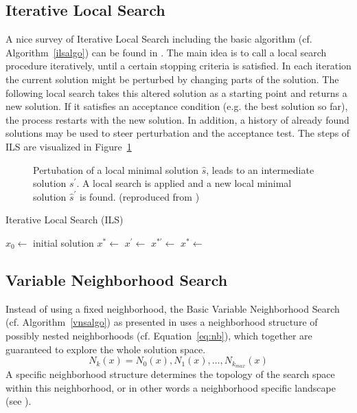 \subsection{Iterative Local Search}
A nice survey of Iterative Local Search including the basic algorithm (cf. Algorithm~\ref{ilsalgo}) can be found in \cite{lourencco2001iterated}. 
The main idea is to call a local search procedure iteratively, until a certain stopping criteria is satisfied. 
In each iteration the current solution might be perturbed by changing parts of the solution. 
The following local search takes this altered solution as a starting point and returns a new solution. 
If it satisfies an acceptance condition (e.g. the best solution so far), the process restarts with the new solution. 
In addition, a history of already found solutions may be used to steer perturbation and the acceptance test.
The steps of ILS are visualized in Figure~\ref{fig:fig_ils}

\begin{figure}[thb] 
   \footnotesize
   \centering
    \def\svgwidth{0.75\textwidth}
    
    \caption[Pertubation step in ILS]{Pertubation of a local minimal solution $\hat{s}$, leads to an intermediate solution $s^\prime$. A local search is applied and a new local minimal solution $\hat{s}^\prime$ is found. (reproduced from \cite{blum2003metaheuristics})}  
     \label{fig:fig_ils}
\end{figure}
 
\begin{algorithm}
\caption{Iterative Local Search (ILS)}
\label{ilsalgo}
\begin{algorithmic}[1]
\State $x_0\gets$ initial solution
\State $x^*\gets$ 
\Repeat
\State $x^\prime \gets$ 
\State $x^{*\prime} \gets$ 
\State $x^* \gets$ 
\end{algorithmic}
\end{algorithm}

\subsection{Variable Neighborhood Search}
Instead of using a fixed neighborhood, the Basic Variable Neighborhood Search (cf. Algorithm~\ref{vnsalgo}) as presented in \cite{VNS} uses a neighborhood structure of possibly nested neighborhoods (cf. Equation~\ref{eq:nb}), which together are guaranteed to explore the whole solution space. 
\begin{equation}
N_k(x)=N_0(x),N_1(x),\dots,N_{k_{max}}(x)
\label{eq:nb}
\end{equation}
A specific neighborhood structure determines the topology of the search space within this neighborhood, or in other words a neighborhood specific landscape (see \cite{blum2003metaheuristics}).

